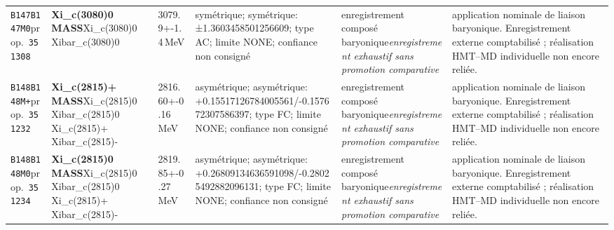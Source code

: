 \begin{landscape}
\begin{longtable}{L{1.85cm}L{4.45cm}L{2.35cm}L{4.05cm}L{3.35cm}L{7.15cm}}
\texttt{B147}\newline \texttt{B147M0}\newline prop.\ \texttt{351308} & \textbf{Xi\_\allowbreak{}c(3080)0 MASS}\newline Xi\_\allowbreak{}c(3080)0 \textbar{}\allowbreak{} Xibar\_\allowbreak{}c(3080)0 & 3079.9+-1.4\,MeV & symétrique; symétrique: ±1.3603458501256609; type AC; limite NONE; confiance non consigné & enregistrement composé baryonique\newline \emph{enregistrement exhaustif sans promotion comparative} & application nominale de liaison baryonique. Enregistrement externe comptabilisé ; réalisation HMT--MD individuelle non encore reliée. \\
\texttt{B148}\newline \texttt{B148M+}\newline prop.\ \texttt{351232} & \textbf{Xi\_\allowbreak{}c(2815)+ MASS}\newline Xi\_\allowbreak{}c(2815)0 \textbar{}\allowbreak{} Xibar\_\allowbreak{}c(2815)0 \textbar{}\allowbreak{} Xi\_\allowbreak{}c(2815)+ \textbar{}\allowbreak{} Xibar\_\allowbreak{}c(2815)- & 2816.60+-0.16\,MeV & asymétrique; asymétrique: +0.15517126784005561/-0.157672307586397; type FC; limite NONE; confiance non consigné & enregistrement composé baryonique\newline \emph{enregistrement exhaustif sans promotion comparative} & application nominale de liaison baryonique. Enregistrement externe comptabilisé ; réalisation HMT--MD individuelle non encore reliée. \\
\texttt{B148}\newline \texttt{B148M0}\newline prop.\ \texttt{351234} & \textbf{Xi\_\allowbreak{}c(2815)0 MASS}\newline Xi\_\allowbreak{}c(2815)0 \textbar{}\allowbreak{} Xibar\_\allowbreak{}c(2815)0 \textbar{}\allowbreak{} Xi\_\allowbreak{}c(2815)+ \textbar{}\allowbreak{} Xibar\_\allowbreak{}c(2815)- & 2819.85+-0.27\,MeV & asymétrique; asymétrique: +0.26809134636591098/-0.28025492882096131; type FC; limite NONE; confiance non consigné & enregistrement composé baryonique\newline \emph{enregistrement exhaustif sans promotion comparative} & application nominale de liaison baryonique. Enregistrement externe comptabilisé ; réalisation HMT--MD individuelle non encore reliée. \\

\end{longtable}
\end{landscape}
